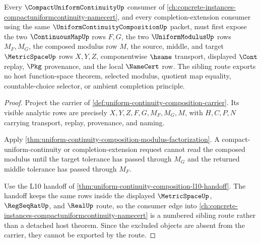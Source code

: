 \begin{theorem}
\label{thm:uniform-continuity-composition-sibling-route}
Every $\CompactUniformContinuityUp$ consumer of \autoref{ch:concrete-instances-compactuniformcontinuity-namecert}, and every completion-extension consumer using the same $\UniformContinuityCompositionUp$ packet, must first expose the two $\ContinuousMapUp$ rows $F,G$, the two $\UniformModulusUp$ rows $M_F,M_G$, the composed modulus row $M$, the source, middle, and target $\MetricSpaceUp$ rows $X,Y,Z$, componentwise $\hsame$ transport, displayed $\Cont$ replay, $\Pkg$ provenance, and the local $\NameCert$ row. The sibling route exports no host function-space theorem, selected modulus, quotient map equality, countable-choice selector, or ambient completion principle.
\end{theorem}
\begin{proof}
Project the carrier of \autoref{def:uniform-continuity-composition-carrier}. Its visible analytic rows are precisely $X,Y,Z,F,G,M_F,M_G,M$, with $H,C,P,N$ carrying transport, replay, provenance, and naming.

Apply \autoref{thm:uniform-continuity-composition-modulus-factorization}. A compact-uniform-continuity or completion-extension request cannot read the composed modulus until the target tolerance has passed through $M_G$ and the returned middle tolerance has passed through $M_F$.

Use the L10 handoff of \autoref{thm:uniform-continuity-composition-l10-handoff}. The handoff keeps the same rows inside the displayed $\MetricSpaceUp$, $\RegSeqRatUp$, and $\RealUp$ route, so the consumer edge into \autoref{ch:concrete-instances-compactuniformcontinuity-namecert} is a numbered sibling route rather than a detached host theorem. Since the excluded objects are absent from the carrier, they cannot be exported by the route.
\end{proof}

